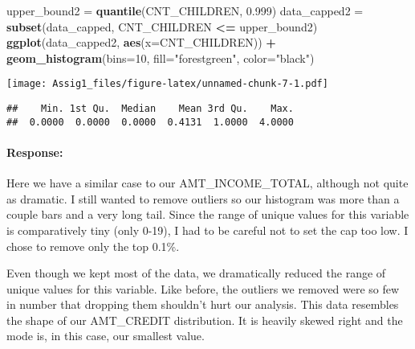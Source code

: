 \documentclass[
]{article}
\newenvironment{Shaded}{\begin{snugshade}}{\end{snugshade}}
\newcommand{\AttributeTok}[1]{\textcolor[rgb]{0.13,0.29,0.53}{#1}}
\newcommand{\DecValTok}[1]{\textcolor[rgb]{0.00,0.00,0.81}{#1}}
\newcommand{\FloatTok}[1]{\textcolor[rgb]{0.00,0.00,0.81}{#1}}
\newcommand{\FunctionTok}[1]{\textcolor[rgb]{0.13,0.29,0.53}{\textbf{#1}}}
\newcommand{\NormalTok}[1]{#1}
\newcommand{\OtherTok}[1]{\textcolor[rgb]{0.56,0.35,0.01}{#1}}
\newcommand{\SpecialCharTok}[1]{\textcolor[rgb]{0.81,0.36,0.00}{\textbf{#1}}}
\newcommand{\StringTok}[1]{\textcolor[rgb]{0.31,0.60,0.02}{#1}}
\begin{document}
\begin{Shaded}
\begin{Highlighting}[]
\NormalTok{upper\_bound2 }\OtherTok{=} \FunctionTok{quantile}\NormalTok{(CNT\_CHILDREN, }\FloatTok{0.999}\NormalTok{)}
\NormalTok{data\_capped2 }\OtherTok{=} \FunctionTok{subset}\NormalTok{(data\_capped, CNT\_CHILDREN }\SpecialCharTok{\textless{}=}\NormalTok{ upper\_bound2)}
\FunctionTok{ggplot}\NormalTok{(data\_capped2, }\FunctionTok{aes}\NormalTok{(}\AttributeTok{x=}\NormalTok{CNT\_CHILDREN)) }\SpecialCharTok{+}
  \FunctionTok{geom\_histogram}\NormalTok{(}\AttributeTok{bins=}\DecValTok{10}\NormalTok{, }\AttributeTok{fill=}\StringTok{"forestgreen"}\NormalTok{, }\AttributeTok{color=}\StringTok{"black"}\NormalTok{)}
\end{Highlighting}
\end{Shaded}

\texttt{[image: Assig1\_files/figure-latex/unnamed-chunk-7-1.pdf]}

\begin{Shaded}
\end{Shaded}

\begin{verbatim}
##    Min. 1st Qu.  Median    Mean 3rd Qu.    Max. 
##  0.0000  0.0000  0.0000  0.4131  1.0000  4.0000
\end{verbatim}

\hypertarget{response-1}{%
\paragraph{Response:}\label{response-1}}

Here we have a similar case to our AMT\_INCOME\_TOTAL, although not
quite as dramatic. I still wanted to remove outliers so our histogram
was more than a couple bars and a very long tail. Since the range of
unique values for this variable is comparatively tiny (only 0-19), I had
to be careful not to set the cap too low. I chose to remove only the top
0.1\%.

\n\n Even though we kept most of the data, we dramatically reduced the
range of unique values for this variable. Like before, the outliers we
removed were so few in number that dropping them shouldn't hurt our
analysis. This data resembles the shape of our AMT\_CREDIT distribution.
It is heavily skewed right and the mode is, in this case, our smallest
value.
\end{document}
